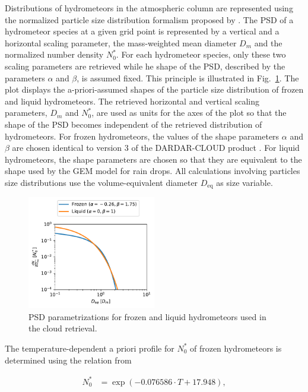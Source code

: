 \documentclass[journal abbreviation, manuscript]{copernicus}
\begin{document}
Distributions of hydrometeors in the atmospheric column are represented using
the normalized particle size distribution formalism proposed by
\cite{delanoe05}. The PSD of a hydrometeor species at a given grid point is
represented by a vertical and a horizontal scaling parameter, the mass-weighted
mean diameter $D_m$ and the normalized number density $N_0^*$. For each
hydrometeor species, only these two scaling parameters are retrieved while he
shape of the PSD, described by the parameters $\alpha$ and $\beta$, is assumed
fixed. This principle is illustrated in Fig.~\ref{fig:psds_retrieval}. The plot
displays the a-priori-assumed shapes of the particle size distribution of frozen
and liquid hydrometeors. The retrieved horizontal and vertical scaling
parameters, $D_m$ and $N_0^*$, are used as units for the axes of the plot so
that the shape of the PSD becomes independent of the retrieved distribution of
hydrometeors. For frozen hydrometeors, the values of the shape parameters
$\alpha$ and $\beta$ are chosen identical to version 3 of the DARDAR-CLOUD
product \citep{cazenave18}. For liquid hydrometeors, the shape parameters are
chosen so that they are equivalent to the shape used by the GEM model for rain
drops. All calculations involving particles size distributions use the
volume-equivalent diameter $D_\text{eq}$ as size variable.

\begin{figure}
\centering
\includegraphics[width = 0.5\textwidth]{../plots/psds_retrieval}
\caption{PSD parametrizations for frozen and liquid hydrometeors
 used in the cloud retrieval.}
\label{fig:psds_retrieval}
\end{figure}

The temperature-dependent a priori profile for $N_0^*$ of frozen
hydrometeors is determined using the relation from \cite{delanoe14}

\begin{align}
N_0^* &= \exp (-0.076586 \cdot T + 17.948),
\end{align}
\end{document}
